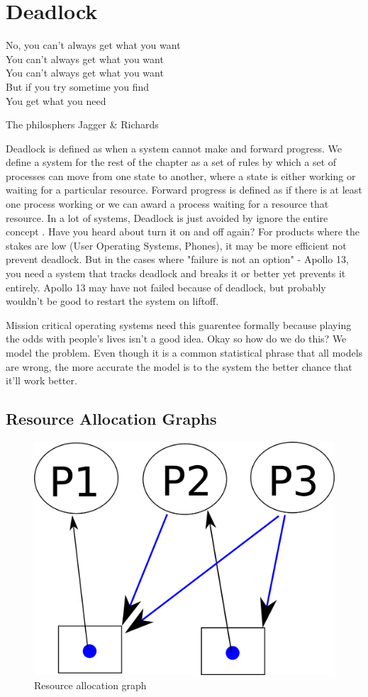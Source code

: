 \chapter{Deadlock}

\epigraph{No, you can't always get what you want
\\You can't always get what you want
\\You can't always get what you want
\\But if you try sometime you find
\\You get what you need}{The philosphers Jagger \& Richards}

\gls{Deadlock} is defined as when a system cannot make and forward progress. We define a system for the rest of the chapter as a set of rules by which a set of processes can move from one state to another, where a state is either working or waiting for a particular resource. Forward progress is defined as if there is at least one process working or we can award a process waiting for a resource that resource. In a lot of systems, Deadlock is just avoided by ignore the entire concept \cite[P.237]{silberschatz2006operating}. Have you heard about turn it on and off again? For products where the stakes are low (User Operating Systems, Phones), it may be more efficient not prevent deadlock. But in the cases where "failure is not an option" - Apollo 13, you need a system that tracks deadlock and breaks it or better yet prevents it entirely. Apollo 13 may have not failed because of deadlock, but probably wouldn't be good to restart the system on liftoff.


Mission critical operating systems need this guarentee formally because playing the odds with people's lives isn't a good idea. Okay so how do we do this? We model the problem. Even though it is a common statistical phrase that all models are wrong, the more accurate the model is to the system the better chance that it'll work better.

\section{Resource Allocation Graphs}

\begin{figure}
  \begin{center}
\includegraphics[width=.25\textwidth]{deadlock/images/resource_allocation.png}
\end{center}
  \caption{Resource allocation graph}
  \label{ragfigure}
\end{figure}


